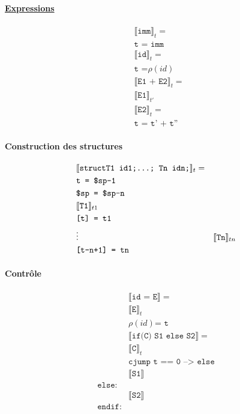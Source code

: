 \documentclass[12pt,twocolumn]{report}
\begin{document}
\begin{trad}
    \paragraph*{ \underline{Expressions}}
    \begin{align*}
        &\llbracket \texttt{imm} \rrbracket_t = \\
        &\texttt{t = imm}\\
        &\llbracket \texttt{id} \rrbracket_t = \\
        &\texttt{t =} \rho(id)\\
        &\llbracket \texttt{E1 + E2} \rrbracket_t = \\
        &\llbracket \texttt{E1} \rrbracket_{t'}\\
        &\llbracket \texttt{E2} \rrbracket_{t} = \\
        &\texttt{t = t' + t''}
    \end{align*}
\end{trad}
\begin{trad}
    \paragraph*{Construction des structures}
    \begin{align*}
        &\llbracket \texttt{struct{T1 id1;\dots; Tn idn;}} \rrbracket_t= \\
        &\texttt{t = \$sp-1}\\
        &\texttt{\$sp = \$sp-n}\\
        &\llbracket \texttt{T1} \rrbracket_{t1} \\
        &\texttt{[t] = t1} \\
        &\vdots
        &\llbracket \texttt{Tn} \rrbracket_{tn}\\
        &\texttt{[t-n+1] = tn} 
    \end{align*}
\end{trad}
\begin{trad}
    \paragraph*{Contrôle}
    \begin{align*}
        &\llbracket \texttt{id = E} \rrbracket= \\
        &\llbracket \texttt{E} \rrbracket_{t} \\
        &\rho(id) \texttt{= t} \\
        &\llbracket \texttt{if(C) S1 else S2} \rrbracket =\\
        &\llbracket \texttt{C} \rrbracket_{t} \\
        &\texttt{cjump t == 0 --> else}\\
        &\llbracket \texttt{S1} \rrbracket\\
        \texttt{else}:&\\
        &\llbracket \texttt{S2} \rrbracket\\
        \texttt{endif}:&
    \end{align*}
\end{trad}
\end{document}

